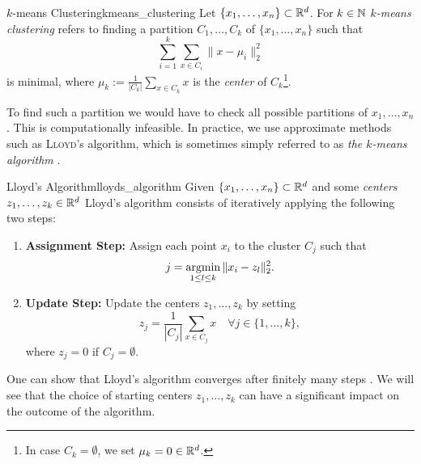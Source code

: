 \begin{definition}{$k$-means Clustering}{kmeans_clustering}
Let $\{x_1, \dots, x_n\} \subset \mathbb R^d$. For $k \in \mathbb N$ \emph{$k$-means clustering} refers to finding a partition $C_1, \dots, C_k$ of $\{x_1, \dots, x_n\}$ such that
\begin{equation*}
\label{eq:kmean_optimization}
    \sum_{i = 1}^k \sum_{x \in C_i} \|x - \mu_i\|^2_2
\end{equation*}
is minimal, where $\mu_k := \frac{1}{|C_k|}\sum_{x \in C_k} x$ is the \emph{center} of $C_k$\footnote{In case $C_k = \emptyset$, we set $\mu_k = 0 \in \mathbb R^d$.}.
\end{definition}
To find such a partition we would have to check all possible partitions of $x_1, \dots, x_n$. This is computationally infeasible. In practice, we use approximate methods such as \textsc{Lloyd}'s algorithm, which is sometimes simply referred to as \emph{the $k$-means algorithm} \cite[Sec.~3.1.2]{Scitovski2021}.

\begin{definition}{Lloyd's Algorithm}{lloyds_algorithm}
Given $\{x_1, \dots, x_n\} \subset \mathbb R^d$ and some \emph{centers} $z_1, \dots, z_k \in \mathbb R^d$
Lloyd's algorithm consists of iteratively applying the following two steps:

\begin{enumerate}
    \item \textbf{Assignment Step:} Assign each point $x_i$ to the cluster $C_j$ such that
    $$
    j = \operatorname*{argmin}_{1 \leq l \leq k} \|x_i - z_l\|^2_2.
    $$

    \item \textbf{Update Step:} Update the centers $z_1, \dots, z_k$ by setting
    $$
    z_j = \frac{1}{|C_j|}\sum_{x \in C_j} x \quad \forall j \in \{1, \dots, k\},
    $$
    where $z_j = 0$ if $C_j = \emptyset$. 
\end{enumerate}
\end{definition}

One can show that Lloyd's algorithm converges after finitely many steps \cite[Thm.~3.14]{Scitovski2021}.
We will see that the choice of starting centers $z_1, \dots, z_k$ can have a significant impact on the outcome of the algorithm.


